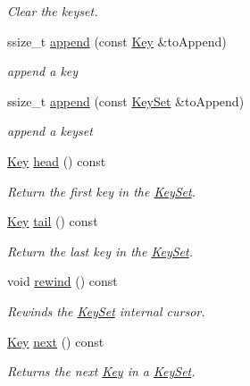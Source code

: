\begin{DoxyCompactItemize}
\begin{DoxyCompactList}\small\item\em Clear the keyset. \end{DoxyCompactList}\item 
ssize\+\_\+t \hyperlink{classkdb_1_1KeySet_a0d4b2f3aa9f58d10053561135b50233e}{append} (const \hyperlink{classkdb_1_1Key}{Key} \&to\+Append)
\begin{DoxyCompactList}\small\item\em append a key \end{DoxyCompactList}\item 
ssize\+\_\+t \hyperlink{classkdb_1_1KeySet_ac9cbdc933d7171037d47c6d4d78595d1}{append} (const \hyperlink{classkdb_1_1KeySet}{Key\+Set} \&to\+Append)
\begin{DoxyCompactList}\small\item\em append a keyset \end{DoxyCompactList}\item 
\hyperlink{classkdb_1_1Key}{Key} \hyperlink{classkdb_1_1KeySet_ad2b65a3aedad1e495351c770b29cd5c4}{head} () const 
\begin{DoxyCompactList}\small\item\em Return the first key in the \hyperlink{classkdb_1_1KeySet}{Key\+Set}. \end{DoxyCompactList}\item 
\hyperlink{classkdb_1_1Key}{Key} \hyperlink{classkdb_1_1KeySet_ac6ccd44a29326a0d9a5c2e60d3089b5e}{tail} () const 
\begin{DoxyCompactList}\small\item\em Return the last key in the \hyperlink{classkdb_1_1KeySet}{Key\+Set}. \end{DoxyCompactList}\item 
void \hyperlink{classkdb_1_1KeySet_a4476a586a48a64160c71ed480c681b19}{rewind} () const 
\begin{DoxyCompactList}\small\item\em Rewinds the \hyperlink{classkdb_1_1KeySet}{Key\+Set} internal cursor. \end{DoxyCompactList}\item 
\hyperlink{classkdb_1_1Key}{Key} \hyperlink{classkdb_1_1KeySet_a03f115c65cf2720411bb76d5f4e10c25}{next} () const 
\begin{DoxyCompactList}\small\item\em Returns the next \hyperlink{classkdb_1_1Key}{Key} in a \hyperlink{classkdb_1_1KeySet}{Key\+Set}. \end{DoxyCompactList}\item 

\end{DoxyCompactItemize}
